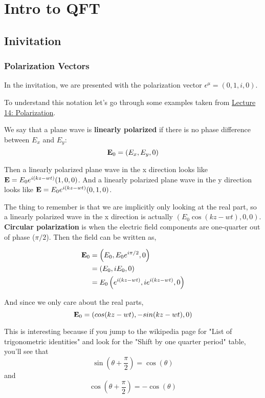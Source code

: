 \chapter{Intro to QFT}

\section{Inivitation}

\subsection{Polarization Vectors}

In the invitation, we are presented with the polarization vector $\epsilon^\mu = (0, 1, i, 0)$.

To understand this notation let's go through some examples taken from
\href{https://scholar.harvard.edu/files/schwartz/files/lecture14-polarization.pdf}{Lecture 14: Polarization}.

We say that a plane wave is \textbf{linearly polarized} if there is no phase difference between $E_x$ and $E_y$:
$$
\boldsymbol{\mathbf{E}}_0 = \left( E_x, E_y, 0 \right)
$$

Then a linearly polarized plane wave in the x direction looks like $\boldsymbol{\mathbf{E}} = E_0 e^{i(kz-wt)} (1, 0, 0)$.
And a linearly polarized plane wave in the y direction looks like $\boldsymbol{\mathbf{E}} = E_0 e^{i(kz-wt)} (0, 1, 0)$.

The thing to remember is that we are implicitly only looking at the real part, so a linearly polarized wave in the x
direction is actually $(E_0 \cos(kz-wt), 0, 0)$.
\\

\textbf{Circular polarization} is when the electric field components are one-quarter out of phase ($\pi /2$).
Then the field can be written as,

\begin{align*}
\boldsymbol{\mathbf{E}}_0 &= \left( E_0, E_0 e^{i\pi/2}, 0 \right) \\
&= \left( E_0, iE_0, 0 \right) \\
&= E_0 \left( e^{i(kz-wt)}, ie^{i(kz-wt)}, 0 \right)
\end{align*}

And since we only care about the real parts,
$$
\boldsymbol{\mathbf{E}}_0 = \left( cos(kz-wt), -sin(kz-wt), 0 \right)
$$

This is interesting because if you jump to the wikipedia page for "List of trigonometric identities"
and look for the "Shift by one quarter period" table, you'll see that
$$
\sin(\theta + \frac{\pi}{2}) = \cos(\theta)
$$
and
$$
\cos(\theta + \frac{\pi}{2}) = -\cos(\theta)
$$

